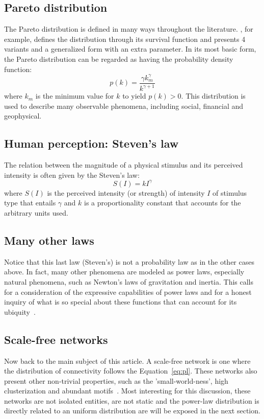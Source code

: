 \documentclass[12pt,fleqn]{article}
\begin{document}
\subsection{Pareto distribution}
The Pareto distribution is defined in many ways throughout the literature.
\cite{paretoWikipedia}, for example, defines the distribution through
its survival function and presents 4 variants and a generalized form
with an extra parameter.
In its most basic form, the Pareto distribution can be regarded as
having the probability density function:
\begin{equation}
	p(k) = \frac{\gamma k_m^\gamma}{k^{\gamma+1}}
\end{equation}
\noindent where $k_m$ is the minimum value for $k$ to yield $p(k)>0$.
This distribution is used to describe many observable phenomena,
including social, financial and geophysical.

\subsection{Human perception: Steven's law}
The relation between the magnitude of a physical stimulus and
its perceived intensity is often given by the Steven's law:
\begin{equation}
	S(I) = kI^\gamma
\end{equation}
\noindent where $S(I)$ is the perceived intensity (or strength)
of intensity $I$ of stimulus type that entails $\gamma$ and
$k$ is a proportionality constant that accounts for the arbitrary
units used.

\subsection{Many other laws}
Notice that this last law (Steven's) is not a probability law as in the other cases above.
In fact, many other phenomena are modeled as power laws, especially natural phenomena,
such as Newton's laws of gravitation and inertia. 
This calls for a consideration of the expressive capabilities of power laws and
for a honest inquiry of what is so special about these functions that
can account for its ubiquity~\citep{fabbri3}.

\subsection{Scale-free networks}
Now back to the main subject of this article.
A scale-free network is one where the distribution of connectivity
follows the Equation~\ref{eq:pl}.
These networks also present other non-trivial properties,
such as the 'small-world-ness', high clusterization and
abundant motifs~\citep{networks}.
Most interesting for this discussion, these networks are not isolated
entities, are not static and the power-law distribution is directly related to
an uniform distribution are will be exposed in the next section.
\end{document}
